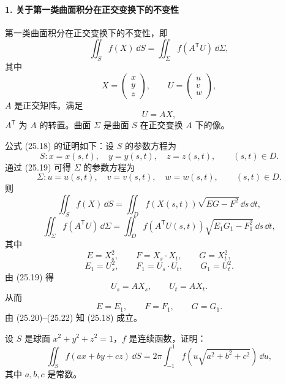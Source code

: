 \paragraph{1. 关于第一类曲面积分在正交变换下的不变性}

第一类曲面积分在正交变换下的不变性，即
\begin{equation}
  \iint_Sf(X)\,\dd S=\iint_\Sigma f(A^{\mathsf T}U)\,\dd\Sigma,
  \tag{25.18}
\end{equation}
其中
\[
  X=\begin{pmatrix}x\\y\\z\end{pmatrix},\qquad
  U=\begin{pmatrix}u\\v\\w\end{pmatrix},
\]
$A$ 是正交矩阵。满足
\begin{equation}
  U=AX,
  \tag{25.19}
\end{equation}
$A^{\mathsf T}$ 为 $A$ 的转置。曲面 $\Sigma$ 是曲面 $S$ 在正交变换 $A$ 下的像。

公式 (25.18) 的证明如下：设 $S$ 的参数方程为
\[
  S:x=x(s,t),\quad y=y(s,t),\quad z=z(s,t),\qquad(s,t)\in D.
\]
通过 (25.19) 可得 $\Sigma$ 的参数方程为
\[
  \Sigma:u=u(s,t),\quad v=v(s,t),\quad w=w(s,t),\qquad(s,t)\in D.
\]
则
\begin{equation}
  \iint_Sf(X)\,\dd S=\iint_Df(X(s,t))\sqrt{EG-F^2}\,\dd s\,\dd t,
  \tag{25.20}
\end{equation}
\begin{equation}
  \iint_\Sigma f(A^{\mathsf T}U)\,\dd\Sigma
  =\iint_Df(A^{\mathsf T}U(s,t))\sqrt{E_1G_1-F_1^2}\,\dd s\,\dd t,
  \tag{25.21}
\end{equation}
其中
\[
  E=X_s^2,\qquad F=X_s\cdot X_t,\qquad G=X_t^2,
\]
\[
  E_1=U_s^2,\qquad F_1=U_s\cdot U_t,\qquad G_1=U_t^2.
\]
由 (25.19) 得
\[
  U_s=AX_s,\qquad U_t=AX_t.
\]
从而
\begin{equation}
  E=E_1,\qquad F=F_1,\qquad G=G_1.
  \tag{25.22}
\end{equation}
由 (25.20)--(25.22) 知 (25.18) 成立。

\begin{xexample}[25.5.1]
设 $S$ 是球面 $x^2+y^2+z^2=1$，$f$ 是连续函数，证明：
\[
  \iint_Sf(ax+by+cz)\,\dd S
  =2\pi\int_{-1}^{1}f\left(u\sqrt{a^2+b^2+c^2}\right)\,\dd u,
\]
其中 $a,b,c$ 是常数。
\end{xexample}


